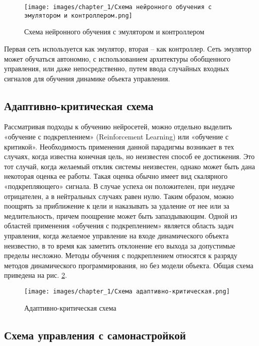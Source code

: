\begin{figure}[H]
    \centering
    \texttt{[image: images/chapter\_1/Схема нейронного обучения с эмулятором и контроллером.png]}
    \caption{Схема нейронного обучения с эмулятором и контроллером}
    \label{fig:neuro_emulator_with_controller}
\end{figure}

Первая сеть используется как эмулятор, вторая – как контроллер. Сеть эмулятор может обучаться автономно, с использованием архитектуры обобщенного управления, или даже непосредственно, путем ввода случайных входных сигналов для обучения динамике объекта управления.

\subsection{Адаптивно-критическая схема}

Рассматривая подходы к обучению нейросетей, можно отдельно выделить  «обучение с подкреплением» (Reinforcement Learning) или «обучение с критикой». Необходимость применения данной парадигмы возникает в тех случаях, когда известна конечная цель, но неизвестен способ ее достижения. Это тот случай, когда желаемый отклик системы неизвестен, однако может быть дана некоторая оценка ее работы. Такая оценка обычно имеет вид скалярного «подкрепляющего» сигнала. В случае успеха он положителен, при неудаче отрицателен, а в нейтральных случаях равен нулю. Таким образом, можно поощрять за приближение к цели и наказывать за удаление от нее или за медлительность, причем поощрение может быть запаздывающим. Одной из областей применения «обучения с подкреплением» является область задач управления, когда желаемое управление на входе динамического объекта неизвестно, в то время как заметить отклонение его выхода за допустимые пределы несложно. Методы обучения с подкреплением относятся к разряду методов динамического программирования, но без модели объекта. Общая схема приведена на рис. \ref{fig:adaptive_critic_control}.

\begin{figure}[H]
    \centering
    \texttt{[image: images/chapter\_1/Схема адаптивно-критическая.png]}
    \caption{Адаптивно-критическая схема}
    \label{fig:adaptive_critic_control}
\end{figure}

\subsection{Схема управления с самонастройкой}

